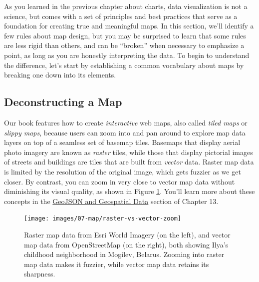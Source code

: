\documentclass[
  english,
]{book}
\begin{document}
As you learned in the previous chapter about charts, data visualization is not a science, but comes with a set of principles and best practices that serve as a foundation for creating true and meaningful maps. In this section, we'll identify a few rules about map design, but you may be surprised to learn that some rules are less rigid than others, and can be ``broken'' when necessary to emphasize a point, as long as you are honestly interpreting the data. To begin to understand the difference, let's start by establishing a common vocabulary about maps by breaking one down into its elements.

\hypertarget{deconstructing-a-map}{%
\subsection*{Deconstructing a Map}\label{deconstructing-a-map}}

Our book features how to create \emph{interactive} web maps, also called \emph{tiled maps} or \emph{slippy maps}, because users can zoom into and pan around to explore map data layers on top of a seamless set of basemap tiles. Basemaps that display aerial photo imagery are known as \emph{raster} tiles, while those that display pictorial images of streets and buildings are tiles that are built from \emph{vector} data. Raster map data is limited by the resolution of the original image, which gets fuzzier as we get closer. By contrast, you can zoom in very close to vector map data without diminishing its visual quality, as shown in Figure \ref{fig:raster-vs-vector-zoom}. You'll learn more about these concepts in the \href{geojson.html}{GeoJSON and Geospatial Data} section of Chapter 13.



\begin{figure}
\texttt{[image: images/07-map/raster-vs-vector-zoom]} \caption{Raster map data from Esri World Imagery (on the left), and vector map data from OpenStreetMap (on the right), both showing Ilya's childhood neighborhood in Mogilev, Belarus. Zooming into raster map data makes it fuzzier, while vector map data retains its sharpness.}\label{fig:raster-vs-vector-zoom}
\end{figure}
\end{document}
